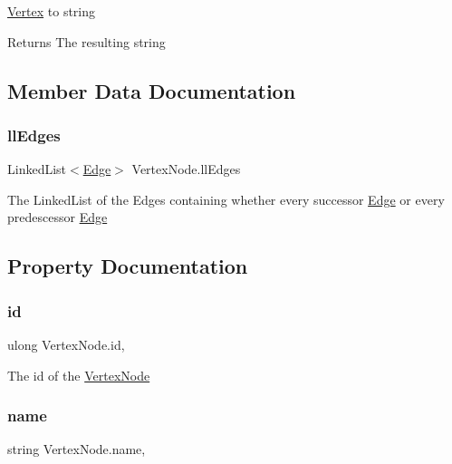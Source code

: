 \hyperlink{structVertex}{Vertex} to string 

\begin{DoxyReturn}{Returns}
The resulting string
\end{DoxyReturn}


\subsection{Member Data Documentation}
\mbox{\label{classVertexNode_aa7cfcf46801fc3960d3ca4d961427211}} 
\subsubsection{\texorpdfstring{ll\+Edges}{llEdges}}
{\footnotesize\ttfamily Linked\+List$<$\hyperlink{classEdge}{Edge}$>$ Vertex\+Node.\+ll\+Edges}



The Linked\+List of the Edges containing whether every successor \hyperlink{classEdge}{Edge} or every predescessor \hyperlink{classEdge}{Edge}



\subsection{Property Documentation}
\mbox{\label{classVertexNode_ab185f268bff8c9339889c6f9954b3fa6}} 
\subsubsection{\texorpdfstring{id}{id}}
{\footnotesize\ttfamily ulong Vertex\+Node.\+id\hspace{0.3cm}{\ttfamily [get]}, {\ttfamily [set]}}



The id of the \hyperlink{classVertexNode}{Vertex\+Node}

\mbox{\label{classVertexNode_a91d893fb3f4cc68e17f1eb8d756245ab}} 
\subsubsection{\texorpdfstring{name}{name}}
{\footnotesize\ttfamily string Vertex\+Node.\+name\hspace{0.3cm}{\ttfamily [get]}, {\ttfamily [set]}}



